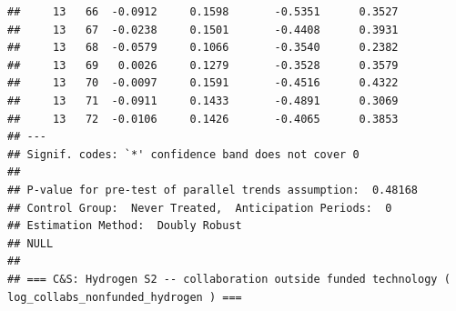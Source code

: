 \documentclass[
]{article}
\begin{document}
\begin{verbatim}
##     13   66  -0.0912     0.1598       -0.5351      0.3527 
##     13   67  -0.0238     0.1501       -0.4408      0.3931 
##     13   68  -0.0579     0.1066       -0.3540      0.2382 
##     13   69   0.0026     0.1279       -0.3528      0.3579 
##     13   70  -0.0097     0.1591       -0.4516      0.4322 
##     13   71  -0.0911     0.1433       -0.4891      0.3069 
##     13   72  -0.0106     0.1426       -0.4065      0.3853 
## ---
## Signif. codes: `*' confidence band does not cover 0
## 
## P-value for pre-test of parallel trends assumption:  0.48168
## Control Group:  Never Treated,  Anticipation Periods:  0
## Estimation Method:  Doubly Robust
## NULL
## 
## === C&S: Hydrogen S2 -- collaboration outside funded technology ( log_collabs_nonfunded_hydrogen ) ===
\end{verbatim}
\end{document}
